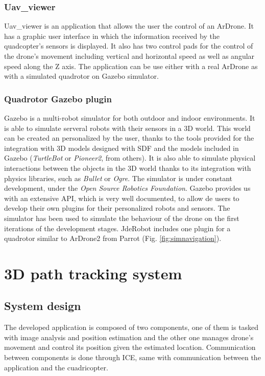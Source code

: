 \documentclass{styles/svproc}
\begin{document}
\subsubsection{Uav\_viewer}

	Uav\_viewer is an application that allows the user the control of an ArDrone. It has a graphic user interface in which the information received by the quadcopter's sensors is displayed. It also has two control pads for the control of the drone's movement including vertical and horizontal speed as well as angular speed along the Z axis. The application can be use either with a real ArDrone as with a simulated quadrotor on Gazebo simulator.

\subsubsection{Quadrotor Gazebo plugin}

	Gazebo is a multi-robot simulator for both outdoor and indoor environments. It is able to simulate serveral robots with their sensors in a 3D world. This world can be created an personalized by the user, thanks to the tools provided for the integration with 3D models designed with SDF and the models included in Gazebo (\textit{TurtleBot} or \textit{Pioneer2}, from others). It is also able to simulate physical interactions between the objects in the 3D world thanks to its integration with physics libraries, such as \textit{Bullet} or \textit{Ogre}. The simulator is under constant development, under the \textit{Open Source Robotics Foundation}. Gazebo provides us with an extensive API, which is very well documented, to allow de users to develop their own plugins for their personalized robots and sensors. The simulator has been used to simulate the behaviour of the drone on the first iterations of the development stages. JdeRobot includes one plugin for a quadrotor similar to ArDrone2 from Parrot (Fig. \ref{fig:simnavigation}).


\section{3D path tracking system}

\subsection{System design}

The developed application is composed of two components, one of them is tasked with image analysis and position estimation and the other one manages drone's movement and control its position given the estimated location. Communication between components is done through ICE, same with communication between the application and the cuadricopter.
	
\end{document}
